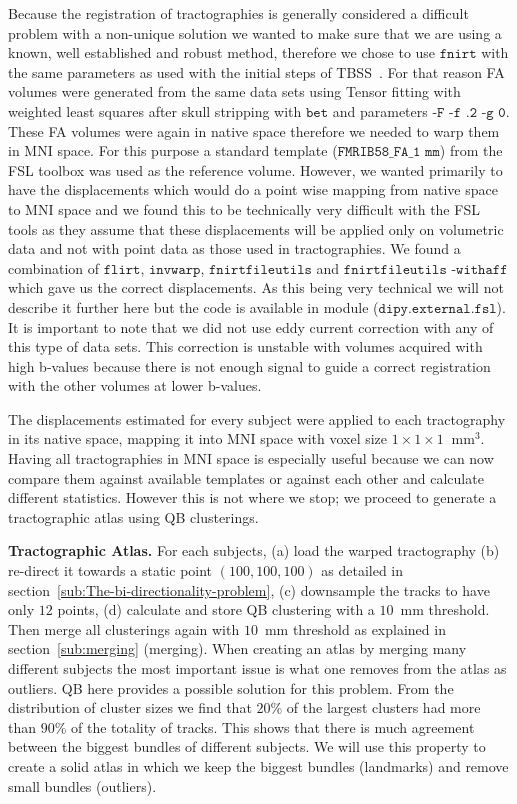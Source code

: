 \documentclass[preprint,authoryear,a4paper,10pt,onecolumn]{elsarticle}
\begin{document}
Because the registration of tractographies is generally considered a
difficult problem with a non-unique solution we wanted to make sure that
we are using a known, well established and robust method, therefore we
chose to use $\texttt{fnirt}$ with the same parameters as used with the
initial steps of TBSS~\citep{Smith2006NeuroImage}. For that reason FA
volumes were generated from the same data sets using Tensor fitting with
weighted least squares after skull stripping with $\texttt{bet}$ and
parameters $\texttt{-F -f .2 -g 0}$. These FA volumes were again in
native space therefore we needed to warp them in MNI space. For this
purpose a standard template ($\texttt{FMRIB58\_FA\_1~mm}$) from the FSL
toolbox was used as the reference volume. However, we wanted primarily
to have the displacements which would do a point wise mapping from
native space to MNI space and we found this to be technically very
difficult with the FSL tools as they assume that these displacements
will be applied only on volumetric data and not with point data as those
used in tractographies. We found a combination of $\texttt{flirt}$,
$\texttt{invwarp}$, $\texttt{fnirtfileutils}$ and
$\texttt{fnirtfileutils -withaff}$ which gave us the correct
displacements. As this being very technical we will not describe it
further here but the code is available in module
($\texttt{dipy.external.fsl}$). It is important to note that we did not
use eddy current correction with any of this type of data sets. This
correction is unstable with volumes acquired with high b-values because
there is not enough signal to guide a correct registration with the
other volumes at lower b-values.

The displacements estimated for every subject were applied
to each tractography in its native space, mapping it into MNI
space with voxel size $1\times1\times1~\textrm{~mm}^{3}$. Having all
tractographies in MNI space is especially useful because we can now
compare them against available templates or against each other and
calculate different statistics. However this is not where we stop; we
proceed to generate a tractographic atlas using QB clusterings.

\textbf{Tractographic Atlas.} For each subjects, (a) load the warped
tractography (b) re-direct it towards a static point $(100,100,100)$ as
detailed in section~\ref{sub:The-bi-directionality-problem}, (c)
downsample the tracks to have only $12$ points, (d) calculate and store
QB clustering with a $10$~mm threshold. Then merge all clusterings again
with $10$~mm threshold as explained in section~\ref{sub:merging}
(merging). When creating an atlas by merging many different subjects
the most important issue is what one removes from the atlas as
outliers. QB here provides a possible solution for this problem. From
the distribution of cluster sizes we find that $20\%$ of the largest
clusters had more than $90\%$ of the totality of tracks. This shows that
there is much agreement between the biggest bundles of different
subjects.  We will use this property to create a solid atlas in which we
keep the biggest bundles (landmarks) and remove small bundles
(outliers).
\end{document}
